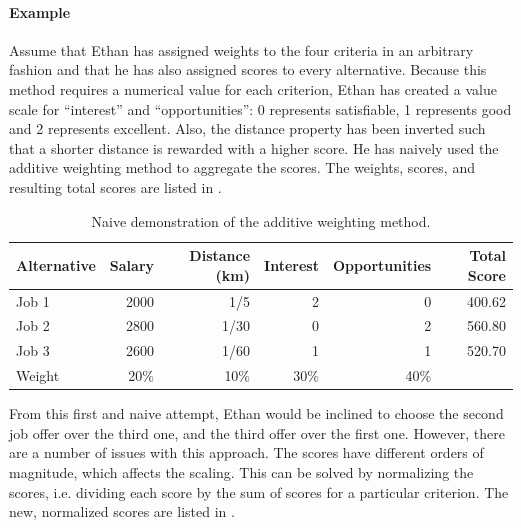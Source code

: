 \paragraph{Example}

Assume that Ethan has assigned weights to the four criteria in an arbitrary fashion and that he has also assigned scores to every alternative. Because this method requires a numerical value for each criterion, Ethan has created a value scale for ``interest'' and ``opportunities'': 0 represents satisfiable, 1 represents good and 2 represents excellent. Also, the distance property has been inverted such that a shorter distance is rewarded with a higher score. He has naively used the additive weighting method to aggregate the scores. The weights, scores, and resulting total scores are listed in .

\begin{table}[h]
    \begin{center}
        \begin{tabular}{lrrrrr}
            \hline
            Alternative & Salary & Distance (km) & Interest & Opportunities & Total Score \\
            \hline
            Job 1       & 2000   & 1/5           & 2        & 0             & 400.62       \\
            Job 2       & 2800   & 1/30          & 0        & 2             & 560.80       \\
            Job 3       & 2600   & 1/60          & 1        & 1             & 520.70      \\
            \hline
            Weight      & 20\%   & 10\%          & 30\%     & 40\%          &             \\
            \hline
        \end{tabular}
        \caption{Naive demonstration of the additive weighting method.}
        \label{tab:sm1}
    \end{center}
\end{table}

From this first and naive attempt, Ethan would be inclined to choose the second job offer over the third one, and the third offer over the first one. However, there are a number of issues with this approach. The scores have different orders of magnitude, which affects the scaling. This can be solved by normalizing the scores, i.e. dividing each score by the sum of scores for a particular criterion. The new, normalized scores are listed in .

